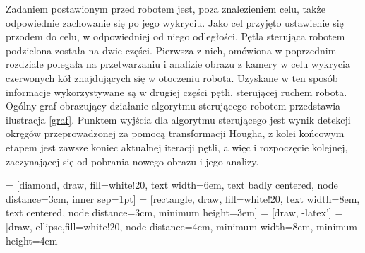 Zadaniem postawionym przed robotem jest, poza znalezieniem celu, także odpowiednie zachowanie się po jego wykryciu. Jako cel przyjęto ustawienie się przodem do celu, w odpowiedniej od niego odległości. Pętla sterująca robotem podzielona została na dwie części. Pierwsza z nich, omówiona w poprzednim rozdziale polegała na przetwarzaniu i analizie obrazu z kamery w celu wykrycia czerwonych kół znajdujących się w otoczeniu robota. Uzyskane w ten sposób informacje wykorzystywane są w drugiej części pętli, sterującej ruchem robota. Ogólny graf obrazujący działanie algorytmu sterującego robotem przedstawia ilustracja \ref{graf}. Punktem wyjścia dla algorytmu sterującego jest wynik detekcji okręgów przeprowadzonej za pomocą transformacji Hougha, z kolei końcowym etapem jest zawsze koniec aktualnej iteracji pętli, a więc i rozpoczęcie kolejnej, zaczynającej się od pobrania nowego obrazu i jego analizy.

 = [diamond, draw, fill=white!20, 
    text width=6em, text badly centered, node distance=3cm, inner sep=1pt]
 = [rectangle, draw, fill=white!20, 
    text width=8em, text centered, node distance=3cm, minimum height=3em]
 = [draw, -latex']
 = [draw, ellipse,fill=white!20, node distance=4cm,
    minimum width=8em, minimum height=4em]
    
